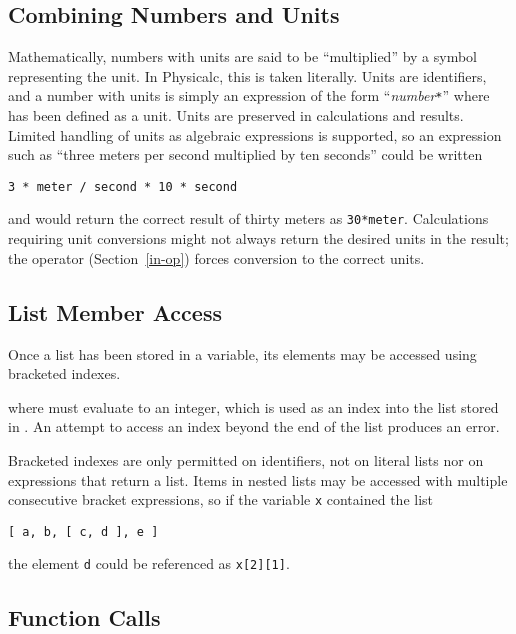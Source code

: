 \subsection{Combining Numbers and Units}
\label{combining-units}

Mathematically, numbers with units are said to be ``multiplied'' by a
symbol representing the unit.  In Physicalc, this is taken literally.
Units are identifiers, and a number with units is simply an expression
of the form ``\textit{number}\verb|*|\id{}'' where \id{} has been
defined as a unit.  Units are preserved in calculations and results.
Limited handling of units as algebraic expressions is supported, so an
expression such as ``three meters per second multiplied by ten
seconds'' could be written

\begin{example}
\verb|3 * meter / second * 10 * second|
\end{example}

\noindent 
and would return the correct result of thirty meters as
\verb|30*meter|.  Calculations requiring unit conversions might not
always return the desired units in the result; the  operator
(Section~\ref{in-op}) forces conversion to the correct units.

\subsection{List Member Access}

Once a list has been stored in a variable, its elements may be
accessed using bracketed indexes.

\begin{syntax}
\id{}\key{[} \expr{} \key{]}
\end{syntax}
where \expr{} must evaluate to an integer, which is used as an index
into the list stored in \id{}.  An attempt to access an index beyond
the end of the list produces an error.

Bracketed indexes are only permitted on identifiers, not on literal
lists nor on expressions that return a list.  Items in nested lists
may be accessed with multiple consecutive bracket expressions, so
if the variable \verb|x| contained the list
\begin{example}
\verb+[ a, b, [ c, d ], e ]+
\end{example}
the element \verb|d| could be referenced as \verb|x[2][1]|.


\subsection{Function Calls}
\label{function-call}

